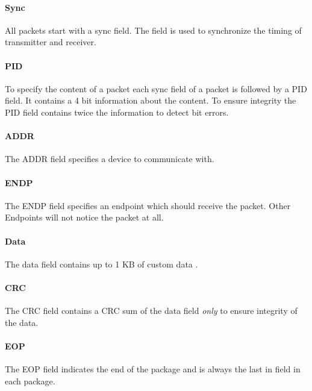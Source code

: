 \documentclass{acm_proc_article-sp}
\begin{document}
\paragraph{Sync}
All packets start with a sync field.
The field is used to synchronize the timing of transmitter and receiver.

\paragraph{PID}
To specify the content of a packet each sync field of a packet is followed by a PID field.
It contains a 4 bit information about the content.
To ensure integrity the PID field contains twice the information to detect bit errors.

\paragraph{ADDR}
The ADDR field specifies a device to communicate with.

\paragraph{ENDP}
The ENDP field specifies an endpoint which should receive the packet.
Other Endpoints will not notice the packet at all.

\paragraph{Data}
The data field contains up to 1 KB of custom data \cite{beyond}.

\paragraph{CRC}
The CRC field contains a CRC sum of the data field \emph{only} to ensure integrity of the data.

\paragraph{EOP}
The EOP field indicates the end of the package and is always the last in field in each package.
\end{document}
